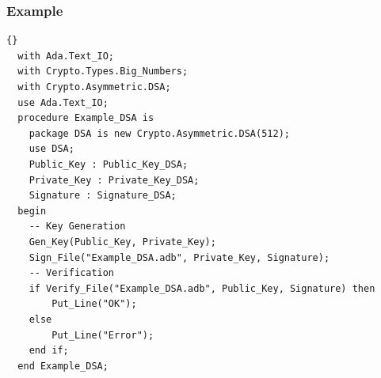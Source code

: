 \subsubsection*{Example}
\begin{lstlisting}{}
  with Ada.Text_IO;
  with Crypto.Types.Big_Numbers;
  with Crypto.Asymmetric.DSA;
  use Ada.Text_IO;
  procedure Example_DSA is
    package DSA is new Crypto.Asymmetric.DSA(512);
    use DSA;
    Public_Key : Public_Key_DSA;
    Private_Key : Private_Key_DSA;
    Signature : Signature_DSA;
  begin
    -- Key Generation
    Gen_Key(Public_Key, Private_Key);
    Sign_File("Example_DSA.adb", Private_Key, Signature);
    -- Verification
    if Verify_File("Example_DSA.adb", Public_Key, Signature) then
        Put_Line("OK");
    else
        Put_Line("Error");
    end if;
  end Example_DSA;
\end{lstlisting}
